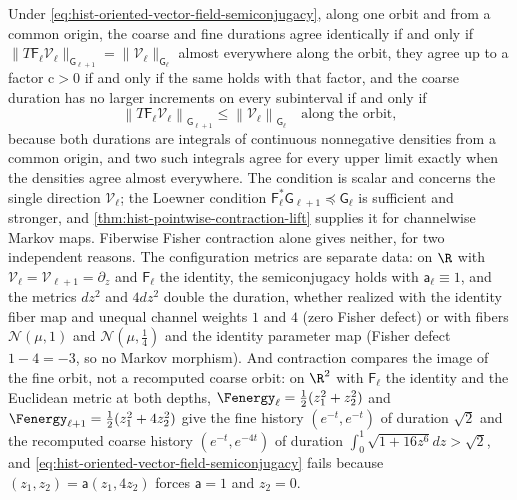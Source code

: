 Under \eqref{eq:hist-oriented-vector-field-semiconjugacy}, along one orbit and from a
common origin, the coarse and fine durations agree identically if and only if
$\lVert T\mathsf F_\ell\mathscr V_\ell\rVert_{\mathsf G_{\ell+1}}=\lVert\mathscr
V_\ell\rVert_{\mathsf G_\ell}$ almost everywhere along the orbit, they agree up to a
factor $\mathrm c>0$ if and only if the same holds with that factor, and the coarse
duration has no larger increments on every subinterval if and only if
\begin{equation}
\left\lVert T\mathsf F_\ell\mathscr V_\ell\right\rVert_{\mathsf G_{\ell+1}}
\leq\left\lVert\mathscr V_\ell\right\rVert_{\mathsf G_\ell}
\quad\text{along the orbit},
\label{eq:hist-duration-criterion}
\end{equation}
because both durations are integrals of continuous nonnegative densities from a common
origin, and two such integrals agree for every upper limit exactly when the densities
agree almost everywhere.  The condition is scalar and concerns the single direction
$\mathscr V_\ell$; the Loewner condition $\mathsf F_\ell^*\mathsf G_{\ell+1}\preceq\mathsf
G_\ell$ is sufficient and stronger, and \cref{thm:hist-pointwise-contraction-lift}
supplies it for channelwise Markov maps.  Fiberwise Fisher contraction alone gives
neither, for two independent reasons.  The configuration metrics are separate data: on
$\R$ with $\mathscr V_\ell=\mathscr V_{\ell+1}=\partial_z$ and $\mathsf F_\ell$ the
identity, the semiconjugacy holds with $\mathsf a_\ell\equiv1$, and the metrics $dz^2$
and $4dz^2$ double the duration, whether realized with the identity fiber map and unequal
channel weights $1$ and $4$ (zero Fisher defect) or with fibers $\mathcal N(\mu,1)$ and
$\mathcal N(\mu,\tfrac14)$ and the identity parameter map (Fisher defect $1-4=-3$, so no
Markov morphism).  And contraction compares the image of the fine orbit, not a recomputed
coarse orbit: on $\R^2$ with $\mathsf F_\ell$ the identity and the Euclidean metric at
both depths, $\Fenergy_\ell=\tfrac12(z_1^2+z_2^2)$ and
$\Fenergy_{\ell+1}=\tfrac12(z_1^2+4z_2^2)$ give the fine history $(e^{-t},e^{-t})$ of
duration $\sqrt2$ and the recomputed coarse history $(e^{-t},e^{-4t})$ of duration
$\int_0^1\sqrt{1+16z^6} dz>\sqrt2$, and
\eqref{eq:hist-oriented-vector-field-semiconjugacy} fails because
$(z_1,z_2)=\mathsf a(z_1,4z_2)$ forces $\mathsf a=1$ and $z_2=0$.  

